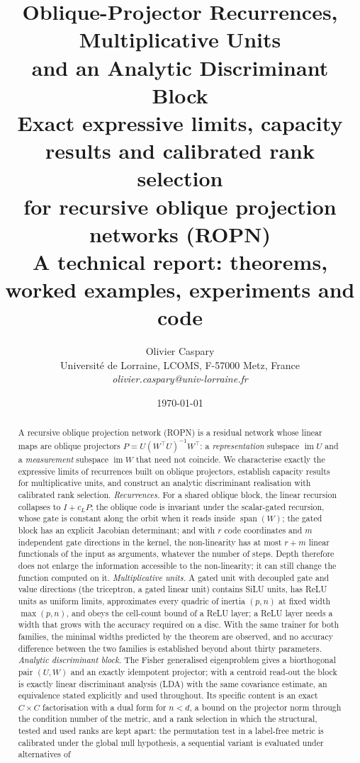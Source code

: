 \documentclass[11pt,a4paper]{article}
\title{Oblique-Projector Recurrences, Multiplicative Units\\ and an Analytic Discriminant Block\\[2mm]
\large Exact expressive limits, capacity results and calibrated rank selection\\ for recursive oblique projection networks (ROPN)\\[1mm]
\normalsize A technical report: theorems, worked examples, experiments and code}
\author{Olivier Caspary \\
    Universit\'e de Lorraine, LCOMS, F-57000 Metz, France \\
    \small{\emph{olivier.caspary@univ-lorraine.fr}}}
\date{\today}
\theoremstyle{plain}
\theoremstyle{definition}
\theoremstyle{remark}
\newcommand{\im}{\operatorname{im}}
\newcommand{\spn}{\operatorname{span}}
\newcommand{\T}{\top}
\begin{document}
\maketitle

\begin{abstract}
A recursive oblique projection network (ROPN) is a residual network whose
linear maps are oblique projectors $P=U(W^\T U)^{-1}W^\T$: a
\emph{representation} subspace $\im U$ and a \emph{measurement} subspace
$\im W$ that need not coincide. We characterise exactly the expressive limits
of recurrences built on oblique projectors, establish capacity results for
multiplicative units, and construct an analytic discriminant realisation
with calibrated rank selection. \emph{Recurrences.} For a shared oblique
block, the linear recursion collapses to $I+c_LP$; the oblique code is
invariant under the scalar-gated recursion, whose gate is constant along
the orbit when it reads inside $\spn(W)$; the gated block has an explicit
Jacobian determinant; and with $r$ code coordinates and $m$ independent
gate directions in the kernel, the non-linearity has at most $r+m$ linear
functionals of the input as arguments, whatever the number of steps. Depth
therefore does not enlarge the information accessible to the non-linearity;
it can still change the function computed on it. \emph{Multiplicative
units.} A gated unit with decoupled gate and value directions (the
triceptron, a gated linear unit) contains SiLU units, has ReLU units as
uniform limits, approximates every quadric of inertia $(p,n)$ at fixed
width $\max(p,n)$, and obeys the cell-count bound of a ReLU layer; a ReLU
layer needs a width that grows with the accuracy required on a disc. With
the same trainer for both families, the minimal widths predicted by the
theorem are observed, and no accuracy difference between the two families
is established beyond about thirty parameters. \emph{Analytic discriminant block.} The
Fisher generalised eigenproblem gives a biorthogonal pair $(U,W)$ and an
exactly idempotent projector; with a centroid read-out the block is exactly
linear discriminant analysis (LDA) with the same covariance estimate, an
equivalence stated explicitly and used throughout. Its specific content is
an exact $C\times C$ factorisation with a dual form for $n<d$, a bound on
the projector norm through the condition number of the metric, and a rank
selection in which the structural, tested and used ranks are kept apart:
the permutation test in a label-free metric is calibrated under the global
null hypothesis, a sequential variant is evaluated under alternatives of

\end{abstract}
\end{document}
